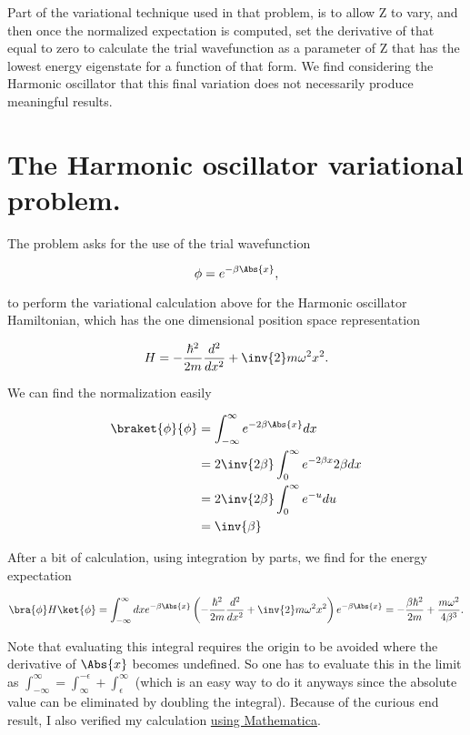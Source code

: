 Part of the variational technique used in that problem, is to allow Z to vary, and then once the normalized expectation is computed, set the derivative of that equal to zero to calculate the trial wavefunction as a parameter of Z that has the lowest energy eigenstate for a function of that form.  We find considering the Harmonic oscillator that this final variation does not necessarily produce meaningful results.

\section{The Harmonic oscillator variational problem.}

The problem asks for the use of the trial wavefunction

\begin{equation}\label{eqn:variationHarmonicOscillator:130}
\phi = e^{-\beta \Abs{x}},
\end{equation}

to perform the variational calculation above for the Harmonic oscillator Hamiltonian, which has the one dimensional position space representation

\begin{equation}\label{eqn:variationHarmonicOscillator:150}
H = -\frac{\hbar^2}{2m} \frac{d^2}{dx^2} + \inv{2} m \omega^2 x^2.
\end{equation}

We can find the normalization easily

\begin{align*}
\braket{\phi}{\phi} 
&= \int_{-\infty}^\infty e^{- 2 \beta \Abs{x}} dx \\
&= 2 \inv{2 \beta} \int_{0}^\infty e^{- 2 \beta x} 2 \beta dx \\
&= 2 \inv{2 \beta} \int_{0}^\infty e^{- u} du \\
&= \inv{\beta}
\end{align*}

After a bit of calculation, using integration by parts, we find for the energy expectation

\begin{equation}\label{eqn:variationHarmonicOscillator:170}
\bra{\phi} H \ket{\phi} = 
\int_{-\infty}^\infty dx
e^{- \beta \Abs{x}} 
\left( -\frac{\hbar^2}{2m} \frac{d^2}{dx^2} + \inv{2} m \omega^2 x^2 \right)
e^{- \beta \Abs{x}} 
= 
-\frac{\beta \hbar^2}{2m} + \frac{m \omega^2}{4 \beta^3}.
\end{equation}

Note that evaluating this integral requires the origin to be avoided where the derivative of $\Abs{x}$ becomes undefined.  So one has to evaluate this in the limit as $\int_{-\infty}^\infty = \int_{\infty}^{-\epsilon} + \int_\epsilon^\infty$ (which is an easy way to do it anyways since the absolute value can be eliminated by doubling the integral).  Because of the curious end result, I also verified my calculation \href{https://github.com/peeterjoot/physicsplay/tree/master/notes/phy456/24.4.3 attempt with mathematica.nb}{using Mathematica}.

